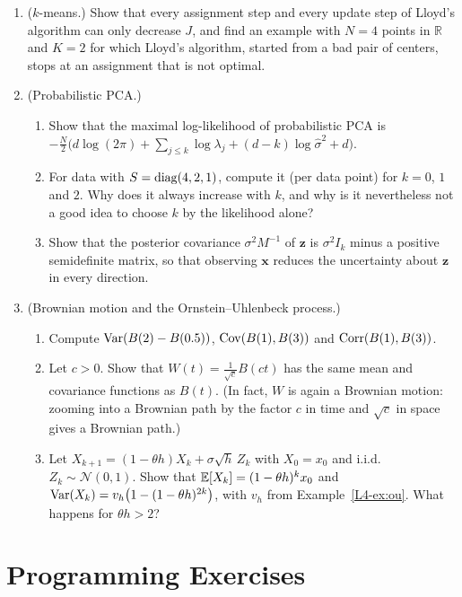 \begin{enumerate}[leftmargin=*]
    \item ($k$-means.) Show that every assignment step and every update step of Lloyd's algorithm can only decrease $J$, and find an example with $N = 4$ points in $\mathbb{R}$ and $K = 2$ for which Lloyd's algorithm, started from a bad pair of centers, stops at an assignment that is not optimal.
    \item (Probabilistic PCA.)
    \begin{enumerate}[label=(\alph*)]
        \item Show that the maximal log-likelihood of probabilistic PCA is $-\frac{N}{2}\big(d\log(2\pi) + \sum_{j \leq k}\log\lambda_j + (d - k)\log\hat\sigma^2 + d\big)$.
        \item For data with $S = \operatorname{diag}(4, 2, 1)$, compute it (per data point) for $k = 0$, $1$ and $2$. Why does it always increase with $k$, and why is it nevertheless not a good idea to choose $k$ by the likelihood alone?
        \item Show that the posterior covariance $\sigma^2M^{-1}$ of $\mathbf{z}$ is $\sigma^2I_k$ minus a positive semidefinite matrix, so that observing $\mathbf{x}$ reduces the uncertainty about $\mathbf{z}$ in every direction.
    \end{enumerate}
    \item (Brownian motion and the Ornstein--Uhlenbeck process.)
    \begin{enumerate}[label=(\alph*)]
        \item Compute $\operatorname{Var}(B(2) - B(0.5))$, $\operatorname{Cov}(B(1), B(3))$ and $\operatorname{Corr}(B(1), B(3))$.
        \item Let $c > 0$. Show that $W(t) = \frac{1}{\sqrt{c}}B(ct)$ has the same mean and covariance functions as $B(t)$. (In fact, $W$ is again a Brownian motion: zooming into a Brownian path by the factor $c$ in time and $\sqrt{c}$ in space gives a Brownian path.)
        \item Let $X_{k+1} = (1 - \theta h)X_k + \sigma\sqrt{h}\,Z_k$ with $X_0 = x_0$ and i.i.d.\ $Z_k \sim \mathcal{N}(0, 1)$. Show that $\mathbb{E}[X_k] = (1 - \theta h)^kx_0$ and $\operatorname{Var}(X_k) = v_h\big(1 - (1 - \theta h)^{2k}\big)$, with $v_h$ from Example~\ref{L4-ex:ou}. What happens for $\theta h > 2$?
    \end{enumerate}
\end{enumerate}

\section{Programming Exercises}\label{L4-sec:programming}

